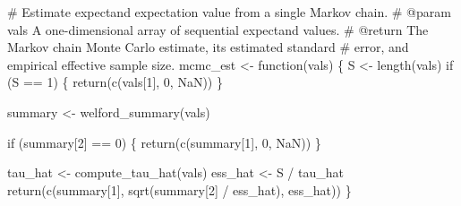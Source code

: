 \documentclass[
  letterpaper,
  DIV=11,
  numbers=noendperiod]{scrartcl}
\newenvironment{Shaded}{\begin{snugshade}}{\end{snugshade}}
\newcommand{\CommentTok}[1]{\textcolor[rgb]{0.37,0.37,0.37}{#1}}
\newcommand{\ControlFlowTok}[1]{\textcolor[rgb]{0.00,0.23,0.31}{#1}}
\newcommand{\DecValTok}[1]{\textcolor[rgb]{0.68,0.00,0.00}{#1}}
\newcommand{\NormalTok}[1]{\textcolor[rgb]{0.00,0.23,0.31}{#1}}
\newcommand{\OperatorTok}[1]{\textcolor[rgb]{0.37,0.37,0.37}{#1}}
\begin{document}
\begin{Shaded}
\begin{Highlighting}[]
\CommentTok{\# Estimate expectand expectation value from a single Markov chain.}
\CommentTok{\# @param vals A one{-}dimensional array of sequential expectand values.}
\CommentTok{\# @return The Markov chain Monte Carlo estimate, its estimated standard }
\CommentTok{\#         error, and empirical effective sample size.}
\NormalTok{mcmc\_est }\OperatorTok{\textless{}{-}}\NormalTok{ function(vals) \{}
\NormalTok{  S }\OperatorTok{\textless{}{-}}\NormalTok{ length(vals)}
  \ControlFlowTok{if}\NormalTok{ (S }\OperatorTok{==} \DecValTok{1}\NormalTok{) \{}
    \ControlFlowTok{return}\NormalTok{(c(vals[}\DecValTok{1}\NormalTok{], }\DecValTok{0}\NormalTok{, NaN))}
\NormalTok{  \}}

\NormalTok{  summary }\OperatorTok{\textless{}{-}}\NormalTok{ welford\_summary(vals)}

  \ControlFlowTok{if}\NormalTok{ (summary[}\DecValTok{2}\NormalTok{] }\OperatorTok{==} \DecValTok{0}\NormalTok{) \{}
    \ControlFlowTok{return}\NormalTok{(c(summary[}\DecValTok{1}\NormalTok{], }\DecValTok{0}\NormalTok{, NaN))}
\NormalTok{  \}}

\NormalTok{  tau\_hat }\OperatorTok{\textless{}{-}}\NormalTok{ compute\_tau\_hat(vals)}
\NormalTok{  ess\_hat }\OperatorTok{\textless{}{-}}\NormalTok{ S }\OperatorTok{/}\NormalTok{ tau\_hat}
  \ControlFlowTok{return}\NormalTok{(c(summary[}\DecValTok{1}\NormalTok{], sqrt(summary[}\DecValTok{2}\NormalTok{] }\OperatorTok{/}\NormalTok{ ess\_hat), ess\_hat))}
\NormalTok{\}}
\end{Highlighting}
\end{Shaded}
\end{document}
